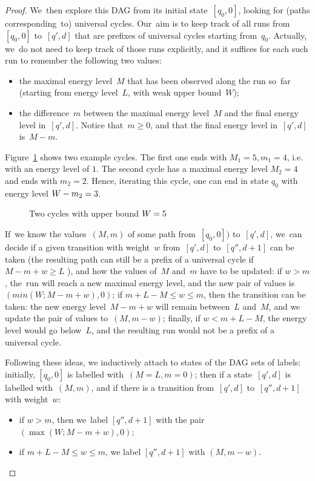 \begin{proof}
    We~then explore this DAG from its initial state~$[q_0,0]$,
    looking for (paths corresponding~to) universal cycles. Our~aim is to keep track of all runs from~$[q_0,0]$ to~$[q',d]$ that are prefixes of universal cycles starting from~$q_0$. Actually, we~do not need to keep track of those runs explicitly, and it suffices for each such run to remember the following two values:
    \begin{itemize}
    \item the maximal energy level~$M$ that has been observed along the run so~far (starting from energy level~$L$, with weak upper bound~$W$);
    \item the difference~$m$ between the maximal energy level~$M$ and the final energy level in~$[q',d]$. Notice that~$m\geq 0$, and that the final energy level in~$[q',d]$ is~$M-m$. 
    \end{itemize}
    
    Figure~\ref{fig-ex_cycles} shows two example cycles. The first one ends with $M_1=5, m_1=4$, i.e. with an energy level of $1$. The second cycle has a maximal energy level $M_2=4$ and ends with $m_2=2$. Hence, iterating this cycle, one can end in state $q_0$ with energy level $W-m_2=3$.
    
    \begin{figure}[htbp]
        \centering
        \scalebox{1.2}{
        
        }
        \caption{Two cycles with upper bound $W=5$}
        \label{fig-ex_cycles}
    \end{figure}
    
    
    
    If~we know the values~$(M,m)$ of some path from~$[q_0,0])$ to~$[q',d]$, we~can decide if a given transition with weight~$w$ from~$[q',d]$ to~$[q'',d+1]$ can be taken 
    (the resulting path can still be a prefix of a universal cycle if $M-m+w \geq L$ ), and how the values of~$M$ and~$m$ have
    to be updated: if $w>m$, the~run will reach a new maximal energy level, and the new pair of values is $(min(W;M-m+w),0)$; if $m+L-M\leq w\leq m$, then the transition can be taken: the new energy level~$M-m+w$ will remain between~$L$ and~$M$, and we update the pair of values to~$(M,m-w)$; finally, if $w<m+L-M$, the energy level would go below~$L$, and the resulting run would not be a prefix of a universal cycle.
    
    
    Following these ideas, we inductively attach to states of the DAG sets of labels:
    initially, $[q_0,0]$ is labelled with~$(M=L,m=0)$; then if a
    state~$[q',d]$ is labelled with~$(M,m)$, and if there is a transition from~$[q',d]$ to~$[q'',d+1]$ with weight~$w$:
    \begin{itemize}
    \item if $w>m$, then we~label $[q'',d+1]$ with the pair $(\max(W;M-m+w),0)$;
    \item if $m+L-M\leq w\leq m$, we label $[q'',d+1]$ with $(M,m-w)$.
    \end{itemize}
    

\end{proof}
